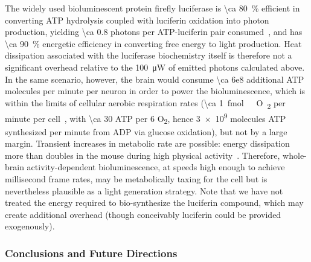 The widely used bioluminescent protein firefly luciferase is \SI{\ca 80}{\percent} efficient in converting ATP hydrolysis coupled with luciferin oxidation into photon production, yielding \num{\ca 0.8} photons per ATP-luciferin pair consumed~\cite{seliger60}, and has \SI{\ca 90}{\percent} energetic efficiency in converting free energy to light production.
Heat dissipation associated with the luciferase biochemistry itself is therefore not a significant overhead relative to the \SI{100}{\micro\watt} of emitted photons calculated above. 
In the same scenario, however, the brain would consume \num{\ca 6e8} additional ATP molecules per minute per neuron in order to power the bioluminescence, which is within the limits of cellular aerobic respiration rates (\SI{\ca 1}{\femto\mole\ O\textsubscript{2}} per minute per cell~\cite{molter09}, with \num{\ca 30} ATP per 6 O\textsubscript{2}, hence \num{3e9} molecules ATP synthesized per minute from ADP via glucose oxidation), but not by a large margin.
Transient increases in metabolic rate are possible: energy dissipation more than doubles in the mouse during high physical activity~\cite{speakman13}.
Therefore, whole-brain activity-dependent bioluminescence, at speeds high enough to achieve millisecond frame rates, may be metabolically taxing for the cell but is nevertheless plausible as a light generation strategy. Note that we have not treated the energy required to bio-synthesize the luciferin compound, which may create additional overhead (though conceivably luciferin could be provided exogenously).

\subsubsection{Conclusions and Future Directions}

